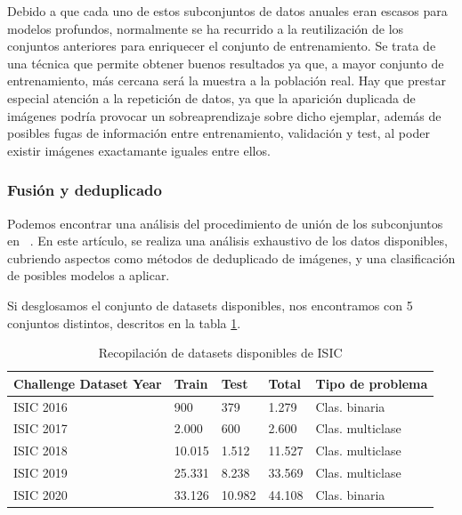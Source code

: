 Debido a que cada uno de estos subconjuntos de datos anuales eran escasos para modelos profundos, normalmente se ha recurrido a la reutilización de los conjuntos anteriores para enriquecer el conjunto de entrenamiento.  Se trata de una técnica que permite obtener buenos resultados ya que, a mayor conjunto de entrenamiento, más cercana será la muestra a la población real.  Hay que prestar especial atención a la repetición de datos, ya que la aparición duplicada de imágenes podría provocar un sobreaprendizaje sobre dicho ejemplar, además de posibles fugas de información entre entrenamiento, validación y test, al poder existir imágenes exactamante iguales entre ellos.

\subsubsection{Fusión y deduplicado}

Podemos encontrar una análisis del procedimiento de unión de los subconjuntos en  ~\cite{CASSIDY2022102305}. En este artículo, se realiza una análisis exhaustivo de los datos disponibles, cubriendo aspectos como métodos de deduplicado de imágenes, y una clasificación de posibles modelos a aplicar.

Si desglosamos el conjunto de datasets disponibles, nos encontramos con 5 conjuntos distintos, descritos en la tabla \ref{tab:isicversions}.
\begin{table}[H]
	\centering
	\begin{tabular}{|l|l|l|l|l|}
		\hline
		\textbf{Challenge Dataset Year} & \textbf{Train} & \textbf{Test} & \textbf{Total} & \textbf{Tipo de problema } \\ \hline
		ISIC 2016 & 900 & 379 & 1.279 & Clas. binaria  \\ \hline
		ISIC 2017 & 2.000 & 600 & 2.600 & Clas. multiclase  \\ \hline
		ISIC 2018 & 10.015 & 1.512 & 11.527 & Clas. multiclase  \\ \hline
		ISIC 2019 & 25.331 & 8.238 & 33.569 & Clas. multiclase  \\ \hline
		ISIC 2020 & 33.126 & 10.982 & 44.108 & Clas. binaria	  \\ \hline
	\end{tabular}
	\caption{Recopilación de datasets disponibles de ISIC}
	\label{tab:isicversions}
\end{table}

